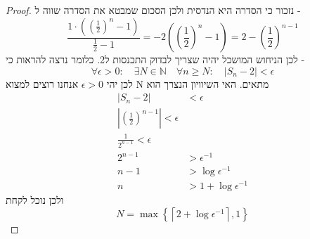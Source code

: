\documentclass{article}
\begin{document}
\begin{proof}
נזכור כי הסדרה היא הנדסית ולכן הסכום שמבטא את הסדרה שווה ל -
\[\frac{1\cdot(\left(\frac{1}{2}\right)^n - 1)}{\frac{1}{2}-1} = -2\left(\left(\frac{1}{2}\right)^n -1\right) = 2-\left(\frac{1}{2}\right)^{n-1}\]
לכן הניחוש המושכל יהיה שצריך לבדוק התכנסות ל2. כלומר נרצה להראות כי - 
\[\forall\epsilon>0:\quad \exists N\in\mathbb{N}\quad\forall n\geq N: \quad |S_n-2|<\epsilon\]
 לכן יהי 
$\epsilon>0$
אנחנו רוצים למצוא N מתאים. האי השיוויון הנצרך הוא
\begin{align*}
|S_n-2|&<\epsilon \\ 
\left|\left(\frac{1}{2}\right)^{n-1}\right|<\epsilon \\
\frac{1}{2^{n-1}}<\epsilon  \\
2^{n-1}&>\epsilon^{-1}\\
n-1&>\log \epsilon^{-1}\\
n&>1+\log\epsilon^{-1} 
\end{align*}
ולכן נוכל לקחת 
\[N = \max\left\{\left\lceil 2+\log\epsilon^{-1}\right\rceil, 1\right\}\]
\end{proof}
\end{document}
